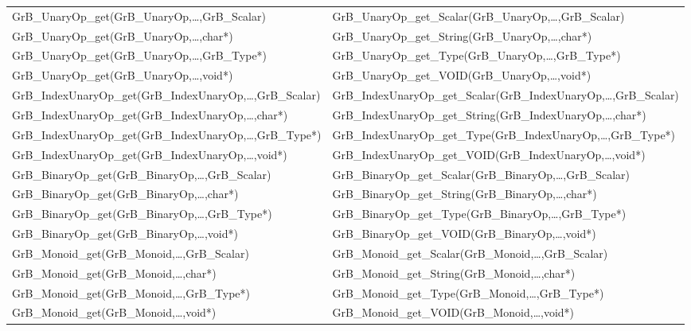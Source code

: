 \begin{table}[htb]
{\begin{tabular}{l|l}
{\sf GrB\_UnaryOp\_get(GrB\_UnaryOp,\ldots,GrB\_Scalar)}  & {\sf GrB\_UnaryOp\_get\_Scalar(GrB\_UnaryOp,\ldots,GrB\_Scalar)} \\
{\sf GrB\_UnaryOp\_get(GrB\_UnaryOp,\ldots,char*)}        & {\sf GrB\_UnaryOp\_get\_String(GrB\_UnaryOp,\ldots,char*)} \\
{\sf GrB\_UnaryOp\_get(GrB\_UnaryOp,\ldots,GrB\_Type*)}   & {\sf GrB\_UnaryOp\_get\_Type(GrB\_UnaryOp,\ldots,GrB\_Type*)} \\
{\sf GrB\_UnaryOp\_get(GrB\_UnaryOp,\ldots,void*)}        & {\sf GrB\_UnaryOp\_get\_VOID(GrB\_UnaryOp,\ldots,void*)} \\

{\sf GrB\_IndexUnaryOp\_get(GrB\_IndexUnaryOp,\ldots,GrB\_Scalar)}  & {\sf GrB\_IndexUnaryOp\_get\_Scalar(GrB\_IndexUnaryOp,\ldots,GrB\_Scalar)} \\
{\sf GrB\_IndexUnaryOp\_get(GrB\_IndexUnaryOp,\ldots,char*)}        & {\sf GrB\_IndexUnaryOp\_get\_String(GrB\_IndexUnaryOp,\ldots,char*)} \\
{\sf GrB\_IndexUnaryOp\_get(GrB\_IndexUnaryOp,\ldots,GrB\_Type*)}   & {\sf GrB\_IndexUnaryOp\_get\_Type(GrB\_IndexUnaryOp,\ldots,GrB\_Type*)} \\
{\sf GrB\_IndexUnaryOp\_get(GrB\_IndexUnaryOp,\ldots,void*)}        & {\sf GrB\_IndexUnaryOp\_get\_VOID(GrB\_IndexUnaryOp,\ldots,void*)} \\
\hline

{\sf GrB\_BinaryOp\_get(GrB\_BinaryOp,\ldots,GrB\_Scalar)}  & {\sf GrB\_BinaryOp\_get\_Scalar(GrB\_BinaryOp,\ldots,GrB\_Scalar)} \\
{\sf GrB\_BinaryOp\_get(GrB\_BinaryOp,\ldots,char*)}        & {\sf GrB\_BinaryOp\_get\_String(GrB\_BinaryOp,\ldots,char*)} \\
{\sf GrB\_BinaryOp\_get(GrB\_BinaryOp,\ldots,GrB\_Type*)}   & {\sf GrB\_BinaryOp\_get\_Type(GrB\_BinaryOp,\ldots,GrB\_Type*)} \\
{\sf GrB\_BinaryOp\_get(GrB\_BinaryOp,\ldots,void*)}        & {\sf GrB\_BinaryOp\_get\_VOID(GrB\_BinaryOp,\ldots,void*)} \\
\hline

{\sf GrB\_Monoid\_get(GrB\_Monoid,\ldots,GrB\_Scalar)}  & {\sf GrB\_Monoid\_get\_Scalar(GrB\_Monoid,\ldots,GrB\_Scalar)} \\
{\sf GrB\_Monoid\_get(GrB\_Monoid,\ldots,char*)}        & {\sf GrB\_Monoid\_get\_String(GrB\_Monoid,\ldots,char*)} \\
{\sf GrB\_Monoid\_get(GrB\_Monoid,\ldots,GrB\_Type*)}   & {\sf GrB\_Monoid\_get\_Type(GrB\_Monoid,\ldots,GrB\_Type*)} \\
{\sf GrB\_Monoid\_get(GrB\_Monoid,\ldots,void*)}        & {\sf GrB\_Monoid\_get\_VOID(GrB\_Monoid,\ldots,void*)} \\
\hline


\end{tabular}}
\end{table}
